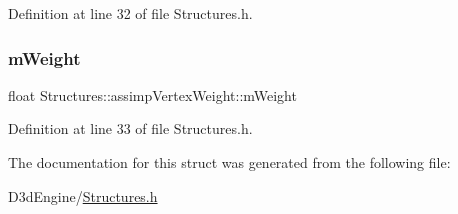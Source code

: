 Definition at line 32 of file Structures.\+h.

\mbox{\label{struct_structures_1_1assimp_vertex_weight_a02fe67c2f228670a7119f6cf8413be40}} 
\subsubsection{\texorpdfstring{m\+Weight}{mWeight}}
{\footnotesize\ttfamily float Structures\+::assimp\+Vertex\+Weight\+::m\+Weight}



Definition at line 33 of file Structures.\+h.



The documentation for this struct was generated from the following file\+:\begin{DoxyCompactItemize}
\item 
D3d\+Engine/\mbox{\hyperlink{_structures_8h}{Structures.\+h}}\end{DoxyCompactItemize}
